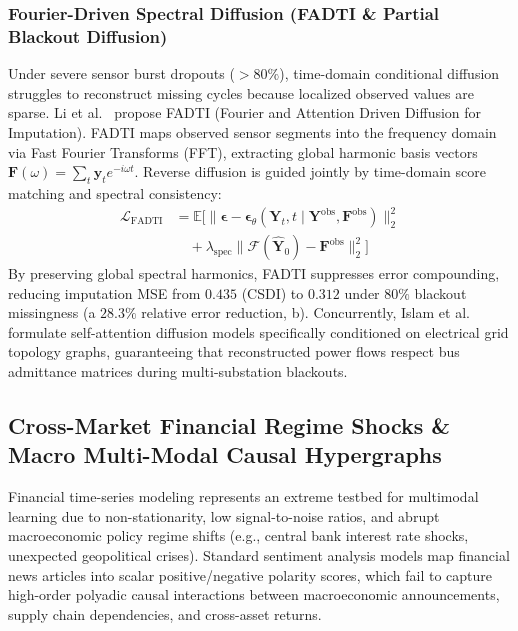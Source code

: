 \subsubsection{Fourier-Driven Spectral Diffusion (FADTI \& Partial Blackout Diffusion)}
Under severe sensor burst dropouts ($>80\%$), time-domain conditional diffusion struggles to reconstruct missing cycles because localized observed values are sparse. Li et al.~\cite{Li2025FADTI} propose FADTI (Fourier and Attention Driven Diffusion for Imputation). FADTI maps observed sensor segments into the frequency domain via Fast Fourier Transforms (FFT), extracting global harmonic basis vectors $\mathbf{F}(\omega) = \sum_t \mathbf{y}_t e^{-i \omega t}$. Reverse diffusion is guided jointly by time-domain score matching and spectral consistency:
\begin{equation}
\begin{aligned}
    \mathcal{L}_{\text{FADTI}} &= \mathbb{E}\Big[ \|\boldsymbol{\epsilon} - \boldsymbol{\epsilon}_\theta(\mathbf{Y}_t, t \mid \mathbf{Y}^{\text{obs}}, \mathbf{F}^{\text{obs}})\|_2^2 \\
    &\quad + \lambda_{\text{spec}} \|\mathcal{F}(\hat{\mathbf{Y}}_0) - \mathbf{F}^{\text{obs}}\|_2^2 \Big]
\end{aligned}
\end{equation}
By preserving global spectral harmonics, FADTI suppresses error compounding, reducing imputation MSE from $0.435$ (CSDI) to $0.312$ under $80\%$ blackout missingness (a $28.3\%$ relative error reduction, b). Concurrently, Islam et al.~\cite{Islam2025PartialBlackout} formulate self-attention diffusion models specifically conditioned on electrical grid topology graphs, guaranteeing that reconstructed power flows respect bus admittance matrices during multi-substation blackouts.

\subsection{Cross-Market Financial Regime Shocks \& Macro Multi-Modal Causal Hypergraphs}
\label{sec:financial_causal_hypergraphs}
Financial time-series modeling represents an extreme testbed for multimodal learning due to non-stationarity, low signal-to-noise ratios, and abrupt macroeconomic policy regime shifts (e.g., central bank interest rate shocks, unexpected geopolitical crises). Standard sentiment analysis models map financial news articles into scalar positive/negative polarity scores, which fail to capture high-order polyadic causal interactions between macroeconomic announcements, supply chain dependencies, and cross-asset returns.

